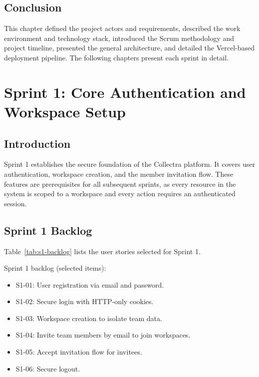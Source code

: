 ﻿\documentclass[12pt,a4paper]{report}
\begin{document}
\section*{Conclusion}
{}

This chapter defined the project actors and requirements, described the work
environment and technology stack, introduced the Scrum methodology and project
timeline, presented the general architecture, and detailed the Vercel-based
deployment pipeline.
The following chapters present each sprint in detail.

\clearpage
\chapter{Sprint 1: Core Authentication and Workspace Setup}
\label{chap:sprint1}

\section*{Introduction}
{}

Sprint 1 establishes the secure foundation of the Collectra platform.
It covers user authentication, workspace creation, and the member invitation flow.
These features are prerequisites for all subsequent sprints, as every resource in
the system is scoped to a workspace and every action requires an authenticated session.

\section{Sprint 1 Backlog}

Table~\ref{tab:s1-backlog} lists the user stories selected for Sprint 1.

\noindent Sprint 1 backlog (selected items):

\begin{itemize}
  \item S1-01: User registration via email and password.
  \item S1-02: Secure login with HTTP-only cookies.
  \item S1-03: Workspace creation to isolate team data.
  \item S1-04: Invite team members by email to join workspaces.
  \item S1-05: Accept invitation flow for invitees.
  \item S1-06: Secure logout.
\end{itemize}
\end{document}

